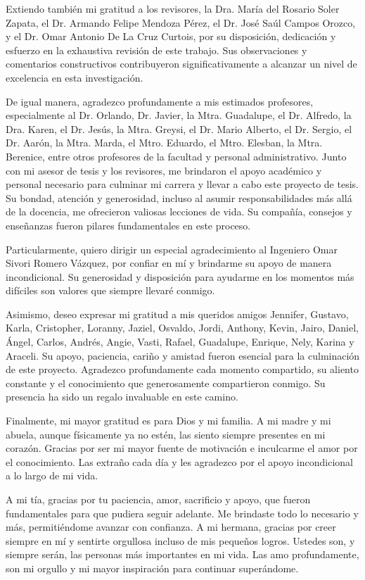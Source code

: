 Extiendo también mi gratitud a los revisores, la Dra. María del Rosario Soler Zapata, el Dr. Armando Felipe Mendoza Pérez, el Dr. José Saúl Campos Orozco, y el Dr. Omar Antonio De La Cruz Curtois, por su disposición, dedicación y esfuerzo en la exhaustiva revisión de este trabajo. Sus observaciones y comentarios constructivos contribuyeron significativamente a alcanzar un nivel de excelencia en esta investigación.

De igual manera, agradezco profundamente a mis estimados profesores, especialmente al Dr. Orlando, Dr. Javier, la Mtra. Guadalupe, el Dr. Alfredo, la Dra. Karen, el Dr. Jesús, la Mtra. Greysi, el Dr. Mario Alberto, el Dr. Sergio, el Dr. Aarón, la Mtra. Marda, el Mtro. Eduardo, el Mtro. Elesban, la Mtra. Berenice, entre otros profesores de la facultad y personal administrativo. Junto con mi asesor de tesis y los revisores, me brindaron el apoyo académico y personal necesario para culminar mi carrera y llevar a cabo este proyecto de tesis. Su bondad, atención y generosidad, incluso al asumir responsabilidades más allá de la docencia, me ofrecieron valiosas lecciones de vida. Su compañía, consejos y enseñanzas fueron pilares fundamentales en este proceso.

Particularmente, quiero dirigir un especial agradecimiento al Ingeniero Omar Sivori Romero Vázquez, por confiar en mí y brindarme su apoyo de manera incondicional. Su generosidad y disposición para ayudarme en los momentos más difíciles son valores que siempre llevaré conmigo.

Asimismo, deseo expresar mi gratitud a mis queridos amigos Jennifer, Gustavo, Karla, Cristopher, Loranny, Jaziel, Osvaldo, Jordi, Anthony, Kevin, Jairo, Daniel, Ángel, Carlos, Andrés, Angie, Vasti, Rafael, Guadalupe, Enrique, Nely,  Karina y Araceli. Su apoyo, paciencia, cariño y amistad fueron esencial para la culminación de este proyecto. Agradezco profundamente cada momento compartido, su aliento constante y el conocimiento que generosamente compartieron conmigo. Su presencia ha sido un regalo invaluable en este camino.

Finalmente, mi mayor gratitud es para Dios y mi familia. A mi madre y mi abuela, aunque físicamente ya no estén, las siento siempre presentes en mi corazón. Gracias por ser mi mayor fuente de motivación e inculcarme el amor por el conocimiento. Las extraño cada día y les agradezco por el apoyo incondicional a lo largo de mi vida.

A mi tía, gracias por tu paciencia, amor, sacrificio y apoyo, que fueron fundamentales para que pudiera seguir adelante. Me brindaste todo lo necesario y más, permitiéndome avanzar con confianza. A mi hermana, gracias por creer siempre en mí y sentirte orgullosa incluso de mis pequeños logros. Ustedes son, y siempre serán, las personas más importantes en mi vida. Las amo profundamente, son mi orgullo y mi mayor inspiración para continuar superándome.

